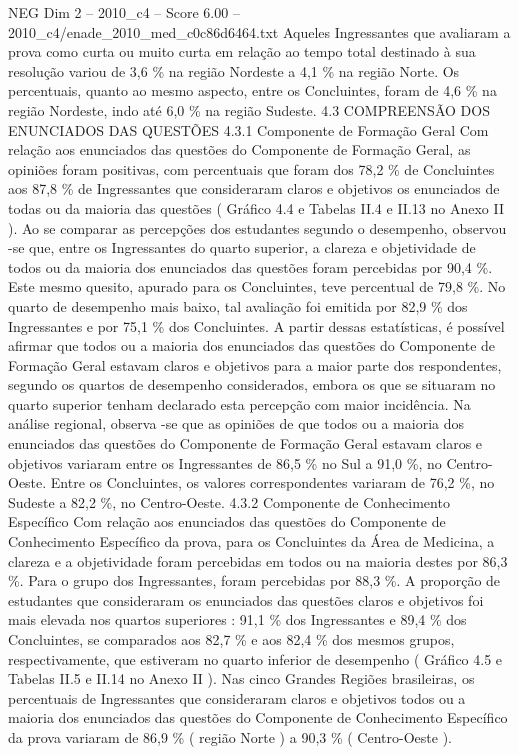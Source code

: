 \begin{textsample}{NEG Dim 2 – 2010\_c4 – Score 6.00 – 2010\_c4/enade\_2010\_med\_c0c86d6464.txt}
Aqueles Ingressantes que avaliaram a prova como curta ou muito curta em relação ao tempo total destinado à sua resolução variou de 3,6 \% na região Nordeste a 4,1 \% na região Norte.
Os percentuais, quanto ao mesmo aspecto, entre os Concluintes, foram de 4,6 \% na região Nordeste, indo até 6,0 \% na região Sudeste. 4.3 COMPREENSÃO DOS ENUNCIADOS DAS QUESTÕES 4.3.1 Componente de Formação Geral Com relação aos enunciados das questões do Componente de Formação Geral, as opiniões foram positivas, com percentuais que foram dos 78,2 \% de Concluintes aos 87,8 \% de Ingressantes que consideraram claros e objetivos os enunciados de todas ou da maioria das questões ( Gráfico 4.4 e Tabelas II.4 e II.13 no Anexo II ).
Ao se comparar as percepções dos estudantes segundo o desempenho, observou -se que, entre os Ingressantes do quarto superior, a clareza e objetividade de todos ou da maioria dos enunciados das questões foram percebidas por 90,4 \%.
Este mesmo quesito, apurado para os Concluintes, teve percentual de 79,8 \%.
No quarto de desempenho mais baixo, tal avaliação foi emitida por 82,9 \% dos Ingressantes e por 75,1 \% dos Concluintes.
A partir dessas estatísticas, é possível afirmar que todos ou a maioria dos enunciados das questões do Componente de Formação Geral estavam claros e objetivos para a maior parte dos respondentes, segundo os quartos de desempenho considerados, embora os que se situaram no quarto superior tenham declarado esta percepção com maior incidência.
Na análise regional, observa -se que as opiniões de que todos ou a maioria dos enunciados das questões do Componente de Formação Geral estavam claros e objetivos variaram entre os Ingressantes de 86,5 \% no Sul a 91,0 \%, no Centro-Oeste.
Entre os Concluintes, os valores correspondentes variaram de 76,2 \%, no Sudeste a 82,2 \%, no Centro-Oeste. 4.3.2 Componente de Conhecimento Específico Com relação aos enunciados das questões do Componente de Conhecimento Específico da prova, para os Concluintes da Área de Medicina, a clareza e a objetividade foram percebidas em todos ou na maioria destes por 86,3 \%.
Para o grupo dos Ingressantes, foram percebidas por 88,3 \%.
A proporção de estudantes que consideraram os enunciados das questões claros e objetivos foi mais elevada nos quartos superiores : 91,1 \% dos Ingressantes e 89,4 \% dos Concluintes, se comparados aos 82,7 \% e aos 82,4 \% dos mesmos grupos, respectivamente, que estiveram no quarto inferior de desempenho ( Gráfico 4.5 e Tabelas II.5 e II.14 no Anexo II ).
Nas cinco Grandes Regiões brasileiras, os percentuais de Ingressantes que consideraram claros e objetivos todos ou a maioria dos enunciados das questões do Componente de Conhecimento Específico da prova variaram de 86,9 \% ( região Norte ) a 90,3 \% ( Centro-Oeste ).

\end{textsample}
